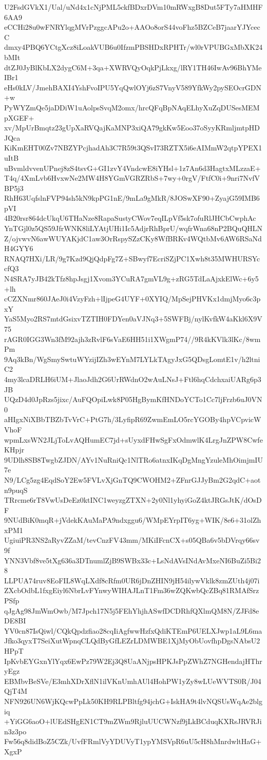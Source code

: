 U2FsdGVkX1/Ual/uNd4x1cNjPML5ckfBDxrDVm10mRWxgB8Dut5FTy7aHMHF6AA9
eCCHi28u0wFNRYlqgMVrPzggcAPu2o+AAOo8orS44voFhz5BZCeB7jaarYJYcecC
dmxy4PBQ6YCtgXcz8iLoakVUB6u0IfzmPBSHDxRPHTr/wl0rVPUBGxMbXK24bMIt
dtZJ0JyBlKbLX2dygC6M+3qa+XWRVQyOqkPjLkxg/lRY1TH46IwAv96BhYMeIBr1
eHs0kLV/JmehBAXI4YshFvoIPU5YqQwlOYj6zS7VnyV589YfkWy2pySEOcrGDN+w
PyWYZmQe5jaDDiW1uAolpsSvqM2omx/hrcQFqBpNAqELhyXuZqDUSesMEMpXGEF+
xv/MpUrBmqtz23gUpXaRVQajKaMNP3xiQA79gkKw5Eoo37oSyyKRmljmtpHDJQca
KiKmEHT00Zv7NBZYPcjhadAh3C7R59t3QSvI73RZTX5i6eAIMmW2qtpYPEX1uItB
uBvmldvvenUPnej8zS4tsvG+GI1zvY4VndcwE8iYHsl+1z7An6d3HagtxMLzzaE+
T4q/4XmLvb6HvxwNe2MW4H8YGmVGRZRbS+7wy+0rgV/FtfC0i+9nri7NvfVBP5j3
RhH63UqfslnFVP94sh5kN9kpPG1nE/9mLa9gMkR/8JOSwXF90+ZyajG59IMB6pVI
4B20rsr864dcUkqU6THaNze8RapaSustyCWov7eqILpVf5sk7ofuRlJHCbCwphAc
YnTGjl0z5QS59JfrWNK8liLYAtjUHi1Ic5AdjrRhBprU/wqfrWna68nP2BQuQHLN
Z/ojvwvN6awWUYAKjdC1aw3OrRspySZzCKy8WfBRKv4WQtbMv6AW6RSaNdH4GYY6
RNAQ7HXi/LR/9g7Kzd9QjQdpFg7Z+SBwyf7EcriSZjPC1Xwh8t35MWHURSYccfQ3
N4SRA7yJB42kTfz8hpJsgj1Xvom3YCuRA7gmVL9g+zRG5TdLaAjxkElWc+6y5+lh
cCZXNmr860JAeJ0i4VzyFzh+lIjpeG4UYF+0XYIQ/MpSejPHVKx1dmjMyo6c3pxY
YaS5Myo2RS7mtdGsixvTZTIH0FDYen0aVJNq3+5SWFBj/nylKvfkW4aKkl6X9V75
rAGR0IGG3Wn3fM92ajh3zRvlF6sVaE6HH51i1XWgmP74//9R4kKVlk3lKc/8wmPm
9Aq3kBn/WgSmySwtuWYzijIZh3wEYnM7LYLkTAgyJxG5QDsgLomtE1v/h2ltniC2
4my3lcaDRLH6iUM+JlaoJdh2G6UrRWdnO2wAuLNsJ+Ftl6hqCdchxaiUARg6p3JB
UQzD4d0JpRzs5jixc/AuFQOpiLwk8P05HgBymKfHNDoYCTo1Cc7ljFrzb6uJ0VN0
aHIgxNiXBbTBZbTvVrC+PtG7h/3LyfipR69ZwmEmLO5rcYGOBy4hpVCpvicWVhoF
wpmLxsWN2JLjToLvAQHumEC7jd+sUyxdFHwSgFxOdmwlK4LrgJnZPW8CwfeKHpjr
9UDlh8SB8TwgbZJDN/AYv1NuRniQc1NlTRo6atnxIKqDgMngYzuleMhOimjmIU7e
N9/LCg5zg4EqdSoY2Ew5FVLvXjGnTQ9CWOHM2+ZFnrGJJyBm2G2qdC+aotn9puqS
TRrcme6rT8VwUsDeEz0ktINC1weyzgZTXN+2y0Nl1yhyiGoZ4ktJRGsJtK/dOsDF
9NUdBiK0mqR+jVdekKAuMaPA9ndxggu6/WMpEYrpIT6yg+WIK/8e6+31olZhxPM1
UgiuiPR3NS2aRyvZZaM/tevCnzFV43mm/MKiIFcnCX+s05QBa6v5bDVrqy66sv9f
YNN3Vbf8ve5tXg636a3DTnumlZjB9SWBx33c+LsNdAVsINdAvMxeNI6BuZi5Bi28
LLPUA74ruv8EoFIL8WqLXdf8cRfm0UR6jDnZHIN9jH54ilywVklk8zmZUth4j07i
ZXcbOdbL1fxgEiyl6NbrLvFYnwyWIHAJLnT1Fm36wZQKwbQcZBq81RMAfSrzPSfp
qJgAg98JmWmOwb/M7Jpch17N5j5FEhYhjhASwfDCDRhfQXlmQM8N/ZJFd8eDE8BI
YV0cn87IsQiwl/CQkQpdzfiao28cqIiAgfwwHzfxQdiKTEmP6UELXJwp1aL9L6ma
Jfko3qyxT7SeiXutWpnqCLQdByGfLEZrLDMWBE1XjMyObUovfhpDgsNAbsU2HPpT
IpKvbEYGxnYlYqx6EwPz79W2Ej3Q8UaANjpsHPKJsPpZWhZ7NGHendajHThryEgz
EBMbvBeSVe/E3mhXDrXflN1ilVKnUmhAUl4HohPW1yZy8wLUeWVTS0R/J04QjT4M
NFN926UN6WjKQcwPpLk50KH9RLPBltfg94jchG+IskHA9t4lvNQSUsWqAe2blgiq
+YiGG6aoO+lUEdSHgEN1CT9mZWm9RjluUUCWNzf9jLkBCduqKXRsJRVRJin3z3po
Fw56q8didBoZ5CZk/UvfFRmlVyYDUVyT1ypYMSVpR6uU5cH8hMnrdwltHaG+XgxP
